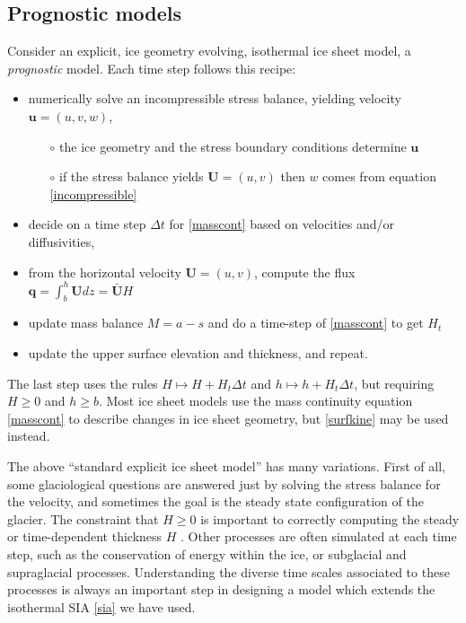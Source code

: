 \documentclass[letterpaper,final,12pt,reqno]{amsart}
\newcommand{\bq}{\mathbf{q}}
\newcommand{\bU}{\mathbf{U}}
\begin{document}
\subsection*{Prognostic models}  Consider an explicit, ice geometry evolving, isothermal ice sheet model, a \emph{prognostic} model.  Each time step follows this recipe:
  \begin{itemize}
  \item numerically solve an incompressible stress balance, yielding velocity $\mathbf{u}=(u,v,w)$,
    \begin{itemize}
    \item[$\circ$] the ice geometry and the stress boundary conditions determine $\mathbf{u}$
    \item[$\circ$] if the stress balance yields $\mathbf{U}=(u,v)$ then $w$ comes from equation \eqref{incompressible}
    \end{itemize}
  \item decide on a time step $\Delta t$ for \eqref{masscont} based on velocities and/or diffusivities,
  \item from the horizontal velocity $\mathbf{U}=(u,v)$, compute the flux $\bq = \int_b^h \bU dz = \bar{\bU} H$
  \item update mass balance $M=a-s$ and do a time-step of \eqref{masscont} to get $H_t$
  \item update the upper surface elevation and thickness, and repeat.
  \end{itemize}
The last step uses the rules $H \mapsto H + H_t \Delta t$ and $h \mapsto h + H_t \Delta t$, but requiring $H\ge 0$ and $h\ge b$.  Most ice sheet models use the mass continuity equation \eqref{masscont} to describe changes in ice sheet geometry, but \eqref{surfkine} may be used instead.

The above ``standard explicit ice sheet model'' has many variations.  First of all, some glaciological questions are answered just by solving the stress balance for the velocity, and sometimes the goal is the steady state configuration of the glacier.  The constraint that $H\ge 0$ is important to correctly computing the steady or time-dependent thickness $H$ \cite{Bueler2016,JouvetBueler2012}.  Other processes are often simulated at each time step, such as the conservation of energy within the ice, or subglacial and supraglacial processes.  Understanding the diverse time scales associated to these processes is always an important step in designing a model which extends the isothermal SIA \eqref{sia} we have used.
\end{document}
